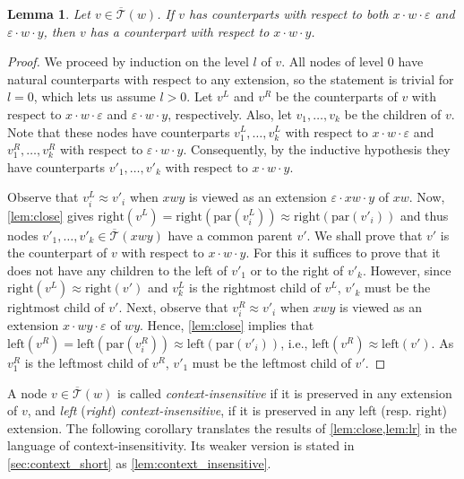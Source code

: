 \documentclass[a4paper]{article}
\newtheorem{lemma}[theorem]{Lemma}
\theoremstyle{remark}
\newcommand{\ustree}{\mathcal{\overline{T}}}
\newcommand{\uspar}{\mathrm{par}}
\newcommand{\usleft}{\mathrm{left}}
\newcommand{\usright}{\mathrm{right}}
\newcommand{\eps}{\varepsilon}
\newcommand{\edot}{{\cdot}}
\begin{document}
\begin{lemma}\label{lem:lr}
Let $v\in \ustree(w)$. If $v$ has counterparts with respect to both $x\edot w \edot \eps$ and $\eps \edot w \edot y$, then $v$
has a counterpart with respect to $x \edot w \edot y$.
\end{lemma}
\begin{proof}
We proceed by induction on the level $l$ of $v$. All nodes of level $0$ have natural counterparts with respect to any extension,
so the statement is trivial  for $l=0$, which lets us assume $l>0$.
Let $v^L$ and $v^R$ be the counterparts of $v$ with respect to $x\edot w \edot \eps$ and $\eps \edot w \edot y$, respectively.
Also, let $v_1,\ldots,v_k$ be the children of $v$.
Note that these nodes have counterparts $v^L_1,\ldots,v^L_k$ with respect to $x\edot w \edot \eps$ and
$v^R_1,\ldots,v^R_k$ with respect to $\eps \edot w \edot y$.
Consequently, by the inductive hypothesis they have counterparts $v'_1,\ldots,v'_k$ with respect to $x\edot w \edot y$.

Observe that $v^L_i \approx v'_i$ when $xwy$ is viewed as an extension $\eps \edot xw\edot y$ of $xw$.
Now, \cref{lem:close} gives $\usright(v^L)=\usright(\uspar(v^L_i))\approx \usright(\uspar(v'_i))$
and thus nodes $v'_1,\ldots,v'_k\in \ustree(xwy)$ have a common parent $v'$. We shall prove
that $v'$ is the counterpart of $v$ with respect to $x \edot w \edot y$. For this it suffices to prove
that it does not have any children to the left of $v'_1$ or to the right of $v'_k$.
However, since $\usright(v^L)\approx \usright(v')$ and $v^L_k$ is the rightmost child of $v^L$,
$v'_k$ must be the rightmost child of $v'$.
Next, observe that $v^R_i \approx v'_i$ when $xwy$ is viewed as an extension $x \edot wy \edot \eps$ of $wy$.
Hence, \cref{lem:close} implies that $\usleft(v^R)=\usleft(\uspar(v^R_i))\approx \usleft(\uspar(v'_i))$,
i.e., $\usleft(v^R) \approx \usleft(v')$. As $v^R_1$ is the leftmost child of $v^R$, $v'_1$ must be the leftmost child of $v'$.
\end{proof}

A node $v\in \ustree(w)$ is called \emph{context-insensitive} if it is preserved in any extension of $v$,
and \emph{left} (\emph{right}) \emph{context-insensitive}, if it is preserved in any left (resp. right) extension.
The following corollary translates the results of \cref{lem:close,lem:lr}
in the language of context-insensitivity. Its weaker version is stated in \cref{sec:context_short} as \cref{lem:context_insensitive}.
\end{document}
